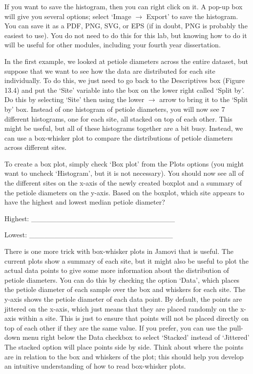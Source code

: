 \documentclass[
]{scrbook}
\begin{document}
\begin{verbatim}






\end{verbatim}

If you want to save the histogram, then you can right click on it.
A pop-up box will give you several options; select `Image \(\to\) Export' to save the histogram.
You can save it as a PDF, PNG, SVG, or EPS (if in doubt, PNG is probably the easiest to use).
You do not need to do this for this lab, but knowing how to do it will be useful for other modules, including your fourth year dissertation.

In the first example, we looked at petiole diameters across the entire dataset, but suppose that we want to see how the data are distributed for each site individually.
To do this, we just need to go back to the Descriptives box (Figure 13.4) and put the `Site' variable into the box on the lower right called `Split by'.
Do this by selecting `Site' then using the lower \(\to\) arrow to bring it to the `Split by' box.
Instead of one histogram of petiole diameters, you will now see 7 different histograms, one for each site, all stacked on top of each other.
This might be useful, but all of these histograms together are a bit busy.
Instead, we can use a box-whisker plot to compare the distributions of petiole diameters across different sites.

To create a box plot, simply check `Box plot' from the Plots options (you might want to uncheck `Histogram', but it is not necessary).
You should now see all of the different sites on the x-axis of the newly created boxplot and a summary of the petiole diameters on the y-axis.
Based on the boxplot, which site appears to have the highest and lowest median petiole diameter?

Highest: \_\_\_\_\_\_\_\_\_\_\_\_\_\_\_\_\_\_\_\_\_\_\_\_\_\_\_\_

Lowest: \_\_\_\_\_\_\_\_\_\_\_\_\_\_\_\_\_\_\_\_\_\_\_\_\_\_\_\_

There is one more trick with box-whisker plots in Jamovi that is useful.
The current plots show a summary of each site, but it might also be useful to plot the actual data points to give some more information about the distribution of petiole diameters.
You can do this by checking the option `Data', which places the petiole diameter of each sample over the box and whiskers for each site.
The y-axis shows the petiole diameter of each data point.
By default, the points are jittered on the x-axis, which just means that they are placed randomly on the x-axis within a site.
This is just to ensure that points will not be placed directly on top of each other if they are the same value.
If you prefer, you can use the pull-down menu right below the Data checkbox to select `Stacked' instead of `Jittered'
The stacked option will place points side by side.
Think about where the points are in relation to the box and whiskers of the plot; this should help you develop an intuitive understanding of how to read box-whisker plots.
\end{document}
